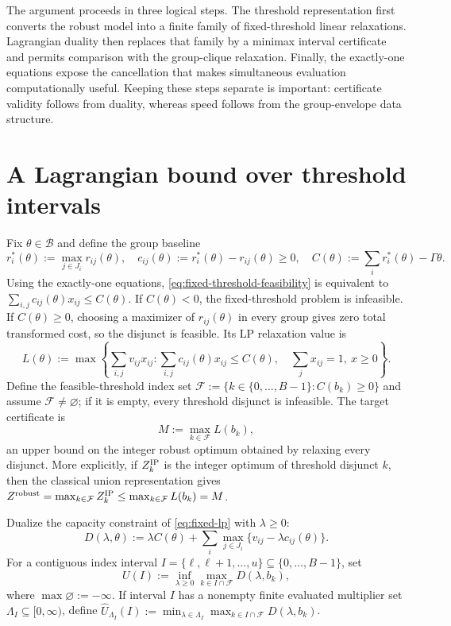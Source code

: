 \documentclass[11pt]{article}
\theoremstyle{plain}
\theoremstyle{definition}
\theoremstyle{remark}
\newcommand{\B}{\mathcal B}
\begin{document}
The argument proceeds in three logical steps.  The threshold representation first converts the robust model into a finite family of fixed-threshold linear relaxations.  Lagrangian duality then replaces that family by a minimax interval certificate and permits comparison with the group-clique relaxation.  Finally, the exactly-one equations expose the cancellation that makes simultaneous evaluation computationally useful.  Keeping these steps separate is important: certificate validity follows from duality, whereas speed follows from the group-envelope data structure.

\section{A Lagrangian bound over threshold intervals}\label{sec:interval-bound}

Fix $\theta\in\B$ and define the group baseline
\[
r_i^*(\theta):=\max_{j\in J_i}r_{ij}(\theta),
\quad c_{ij}(\theta):=r_i^*(\theta)-r_{ij}(\theta)\ge0,
\quad C(\theta):=\sum_i r_i^*(\theta)-\Gamma\theta.
\]
Using the exactly-one equations, \eqref{eq:fixed-threshold-feasibility} is equivalent to
$\sum_{i,j}c_{ij}(\theta)x_{ij}\le C(\theta)$.  If $C(\theta)<0$, the fixed-threshold problem is infeasible.  If $C(\theta)\ge0$, choosing a maximizer of $r_{ij}(\theta)$ in every group gives zero total transformed cost, so the disjunct is feasible.  Its LP relaxation value is
\begin{equation}\label{eq:fixed-lp}
L(\theta):=\max\left\{
\sum_{i,j}v_{ij}x_{ij}:
\sum_{i,j}c_{ij}(\theta)x_{ij}\le C(\theta),\quad
\sum_jx_{ij}=1,\ x\ge0
\right\}.
\end{equation}
Define the feasible-threshold index set
$\mathcal F:=\{k\in\{0,\ldots,B-1\}:C(b_k)\ge0\}$ and assume $\mathcal F\ne\varnothing$; if it is empty, every threshold disjunct is infeasible.  The target certificate is
\begin{equation}\label{eq:target-M}
M:=\max_{k\in\mathcal F}L(b_k),
\end{equation}
an upper bound on the integer robust optimum obtained by relaxing every disjunct.  More explicitly, if $Z_k^{\rm IP}$ is the integer optimum of threshold disjunct $k$, then the classical union representation gives
$Z^{\rm robust}=\max_{k\in\mathcal F}Z_k^{\rm IP}\le\max_{k\in\mathcal F}L(b_k)=M$.

Dualize the capacity constraint of \eqref{eq:fixed-lp} with $\lambda\ge0$:
\begin{equation}\label{eq:dense-D}
D(\lambda,\theta):=\lambda C(\theta)
+\sum_i\max_{j\in J_i}\{v_{ij}-\lambda c_{ij}(\theta)\}.
\end{equation}
For a contiguous index interval $I=\{\ell,\ell+1,\ldots,u\}\subseteq\{0,\ldots,B-1\}$, set
\begin{equation}\label{eq:U-I}
U(I):=\inf_{\lambda\ge0}\max_{k\in I\cap\mathcal F}D(\lambda,b_k),
\end{equation}
where $\max\varnothing:=-\infty$.
If interval $I$ has a nonempty finite evaluated multiplier set $\Lambda_I\subseteq[0,\infty)$, define
$\widehat U_{\Lambda_I}(I):=\min_{\lambda\in\Lambda_I}\max_{k\in I\cap\mathcal F}D(\lambda,b_k)$.
\end{document}
